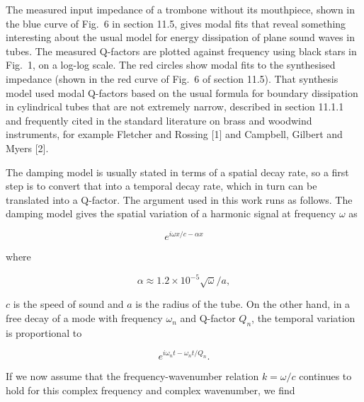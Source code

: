   The measured input impedance of a trombone without its mouthpiece, shown in 
  the blue curve of Fig.\ 6 in section 11.5, gives modal fits that reveal 
  something interesting about the usual model for energy dissipation of plane 
  sound waves in tubes. The measured Q-factors are plotted against frequency 
  using black stars in Fig.\ 1, on a log-log scale. The red circles show modal 
  fits to the synthesised impedance (shown in the red curve of Fig.\ 6 of 
  section 11.5). That synthesis model used modal Q-factors based on the usual 
  formula for boundary dissipation in cylindrical tubes that are not extremely 
  narrow, described in section 11.1.1 and frequently cited in the standard 
  literature on brass and woodwind instruments, for example Fletcher and 
  Rossing [1] and Campbell, Gilbert and Myers [2]. 


  The damping model is usually stated in terms of a spatial decay rate, so a 
  first step is to convert that into a temporal decay rate, which in turn can 
  be translated into a Q-factor. The argument used in this work runs as 
  follows. The damping model gives the spatial variation of a harmonic signal 
  at frequency $\omega$ as 

  \begin{equation*}e^{i\omega x/c-\alpha x} \tag{1}\end{equation*} 

  \noindent{}where 

  \begin{equation*}\alpha \approx 1.2 \times 10^{-5} \sqrt{\omega}/a, 
  \tag{2}\end{equation*} 

  $c$ is the speed of sound and $a$ is the radius of the tube. On the other 
  hand, in a free decay of a mode with frequency $\omega_n$ and Q-factor $Q_n$, 
  the temporal variation is proportional to 

  \begin{equation*}e^{i \omega_n t -\omega_n t/Q_n} . \tag{3}\end{equation*} 

  If we now assume that the frequency-wavenumber relation $k=\omega/c$ 
  continues to hold for this complex frequency and complex wavenumber, we find 

